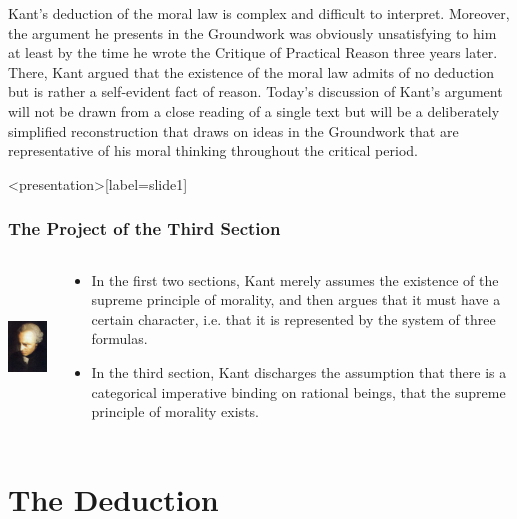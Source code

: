 Kant’s deduction of the moral law is complex and difficult to interpret. Moreover, the argument he presents in the Groundwork was obviously unsatisfying to him at least by the time he wrote the Critique of Practical Reason three years later. There, Kant argued that the existence of the moral law admits of no deduction but is rather a self-evident fact of reason. Today’s discussion of Kant’s argument will not be drawn from a close reading of a single text but will be a deliberately simplified reconstruction that draws on ideas in the Groundwork that are representative of his moral thinking throughout the critical period. \change

\begin{frame}<presentation>[label=slide1]
    \frametitle{The Project of the Third Section}
        \begin{columns}
            \begin{column}{3cm}
                \includegraphics[height=4cm]{../../graphics/kant.jpg}
            \end{column}
            \begin{column}{7cm}
                \begin{itemize}
                    \item In the first two sections, Kant merely assumes the existence of the supreme principle of morality, and then argues that it must have a certain character, i.e. that it is represented by the system of three formulas.
                    \item In the third section, Kant discharges the assumption that there is a categorical imperative binding on rational beings, that the supreme principle of morality exists.
                \end{itemize}
            \end{column}
        \end{columns}
\end{frame}


\section{The Deduction}\label{sec:the_deduction} %

